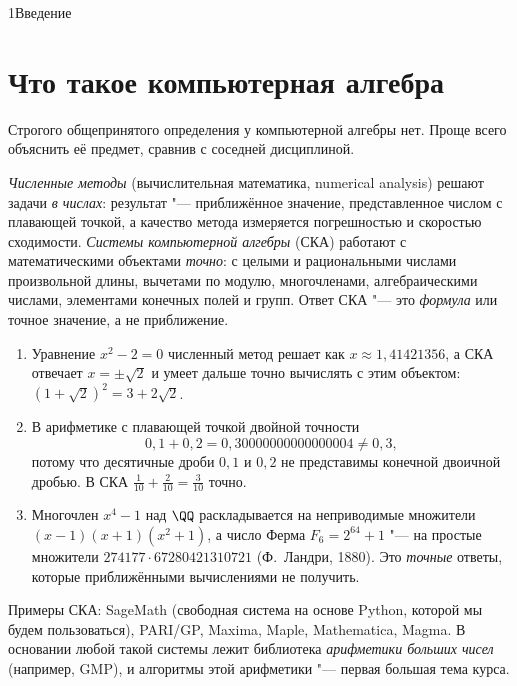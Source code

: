 \begin{lecture}{1}{Введение}

\section{Что такое компьютерная алгебра}

Строгого общепринятого определения у компьютерной алгебры нет. Проще всего объяснить её
предмет, сравнив с соседней дисциплиной.

\emph{Численные методы} (вычислительная математика, numerical analysis) решают задачи
\emph{в числах}: результат "--- приближённое значение, представленное числом с плавающей
точкой, а качество метода измеряется погрешностью и скоростью сходимости. \emph{Системы
компьютерной алгебры} (СКА) работают с математическими объектами \emph{точно}: с целыми и
рациональными числами произвольной длины, вычетами по модулю, многочленами, алгебраическими
числами, элементами конечных полей и групп. Ответ СКА "--- это \emph{формула} или точное
значение, а не приближение.

\begin{example}\label{l1:symbolic}
\begin{enumerate}
  \item Уравнение $x^2 - 2 = 0$ численный метод решает как $x \approx 1{,}41421356$, а СКА
    отвечает $x = \pm\sqrt 2$ и умеет дальше точно вычислять с этим объектом:
    $(1 + \sqrt 2)^2 = 3 + 2\sqrt 2$.
  \item В арифметике с плавающей точкой двойной точности
    \[0{,}1 + 0{,}2 = 0{,}30000000000000004 \ne 0{,}3,\]
    потому что десятичные дроби $0{,}1$ и $0{,}2$ не
    представимы конечной двоичной дробью. В СКА $\frac1{10} + \frac2{10} = \frac3{10}$ точно.
  \item Многочлен $x^4 - 1$ над $\QQ$ раскладывается на неприводимые множители
    $(x - 1)(x + 1)(x^2 + 1)$, а число Ферма $F_6 = 2^{64} + 1$ "--- на простые множители
    $274177 \cdot 67280421310721$ (Ф.~Ландри, 1880). Это \emph{точные} ответы, которые
    приближёнными вычислениями не получить.
\end{enumerate}
\end{example}

Примеры СКА: SageMath (свободная система на основе Python, которой мы будем пользоваться),
PARI/GP, Maxima, Maple, Mathematica, Magma. В основании любой такой системы лежит библиотека
\emph{арифметики больших чисел} (например, GMP), и алгоритмы этой арифметики "--- первая
большая тема курса.


\end{lecture}
